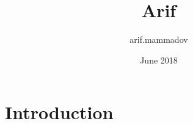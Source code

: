 \documentclass{article}
\title{Arif}
\author{arif.mammadov }
\date{June 2018}
\begin{document}
\maketitle

\section{Introduction}
\end{document}
